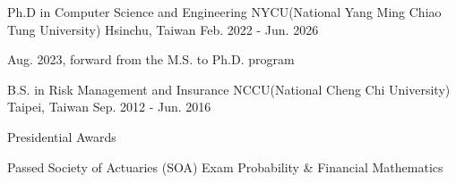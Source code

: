 

\begin{cventries}

  \cventry
    {Ph.D in Computer Science and Engineering} %
    {NYCU(National Yang Ming Chiao Tung University)} %
    {Hsinchu, Taiwan} %
    {Feb. 2022 - Jun. 2026} %
    {
      \begin{cvitems} %
        \item {Aug. 2023, forward from the M.S. to Ph.D. program}
      \end{cvitems}
    }

  \cventry
    {B.S. in Risk Management and Insurance} %
    {NCCU(National Cheng Chi University)} %
    {Taipei, Taiwan} %
    {Sep. 2012 - Jun. 2016} %
    {
      \begin{cvitems} %
        \item {Presidential Awards}
        \item {Passed Society of Actuaries (SOA) Exam Probability \& Financial Mathematics}
      \end{cvitems}
    }

\end{cventries}
